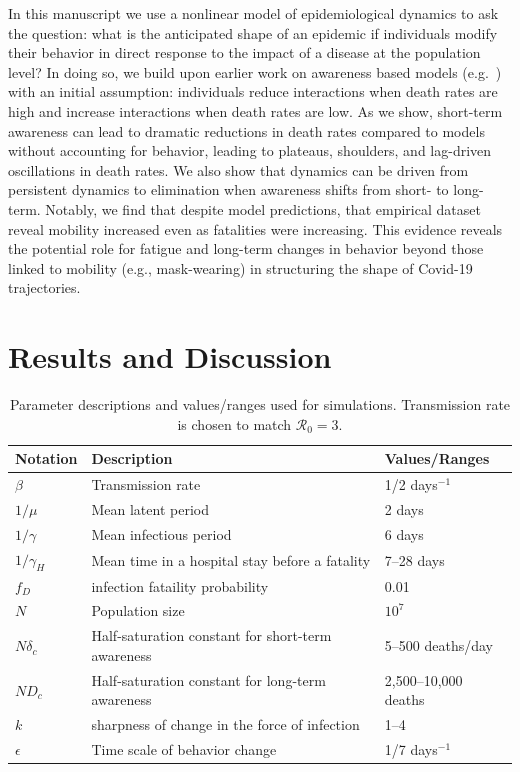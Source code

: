 In this manuscript we use a nonlinear model of epidemiological dynamics to
ask the question: what is the anticipated
shape of an epidemic if individuals modify their behavior in direct
response to the impact of a disease at the population level? In doing so,
we build upon earlier work on awareness based models (e.g.~\citep{funk2009spread,funk2010modelling,eksin2017disease, eksin2019systematic}) with an
initial assumption: individuals reduce interactions when 
death rates are high and increase interactions when death rates are low.  
As we show, short-term awareness can lead to dramatic reductions
in death rates compared to models without accounting for behavior,
leading to plateaus, shoulders,
and lag-driven oscillations in death rates. We also show that dynamics
can be driven from persistent dynamics to elimination when
awareness shifts from short- to long-term. Notably, we find
that despite model predictions, that empirical dataset reveal
mobility increased even as fatalities were increasing. This
evidence reveals the potential role for fatigue and long-term
changes in behavior beyond those linked to mobility (e.g., mask-wearing)
in structuring the shape of Covid-19 trajectories.

\section{Results and Discussion}

\begin{table}[!h]
\begin{tabular}{l|p{3cm}|l}
\hline
Notation & Description & Values/Ranges\\
\hline
$\beta$ & Transmission rate & 1/2 days$^{-1}$ \\
$1/\mu$ & Mean latent period & 2 days \\
$1/\gamma$ & Mean infectious period & 6 days \\
$1/\gamma_H$ & Mean time in a hospital stay before a fatality & 7--28 days\\
$f_D$ & infection fataility probability & 0.01 \\
$N$ & Population size & $10^7$ \\
$N\delta_c$ & Half-saturation constant for short-term awareness & 5--500 deaths/day \\
$ND_c$ & Half-saturation constant for long-term awareness & 2,500--10,000 deaths \\
$k$ & sharpness of change in the force of infection & 1--4 \\
$\epsilon$ & Time scale of behavior change & 1/7 days$^{-1}$\\
\hline
\end{tabular}
\caption{
Parameter descriptions and values/ranges used for simulations. Transmission rate is chosen to match $\mathcal{R}_0 = 3$.
}
\end{table}

